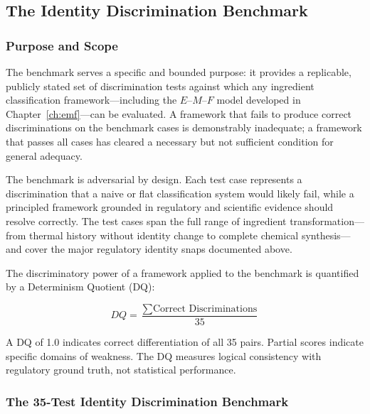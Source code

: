 \documentclass[12pt,a3paper]{article}
\begin{document}
\subsection{The Identity Discrimination Benchmark}
\label{sec:benchmark}

\subsubsection{Purpose and Scope}

The benchmark serves a specific and bounded purpose: it provides a replicable, publicly stated set of discrimination tests against which any ingredient classification framework---including the $E$--$M$--$F$ model developed in Chapter~\ref{ch:emf}---can be evaluated. A framework that fails to produce correct discriminations on the benchmark cases is demonstrably inadequate; a framework that passes all cases has cleared a necessary but not sufficient condition for general adequacy.

The benchmark is adversarial by design. Each test case represents a discrimination that a naive or flat classification system would likely fail, while a principled framework grounded in regulatory and scientific evidence should resolve correctly. The test cases span the full range of ingredient transformation---from thermal history without identity change to complete chemical synthesis---and cover the major regulatory identity snaps documented above.

The discriminatory power of a framework applied to the benchmark is quantified by a Determinism Quotient (DQ):

\begin{equation}
DQ = \frac{\sum \text{Correct Discriminations}}{35}
\label{eq:dq}
\end{equation}

A DQ of 1.0 indicates correct differentiation of all 35 pairs. Partial scores indicate specific domains of weakness. The DQ measures logical consistency with regulatory ground truth, not statistical performance.

\subsubsection{The 35-Test Identity Discrimination Benchmark}
\end{document}
